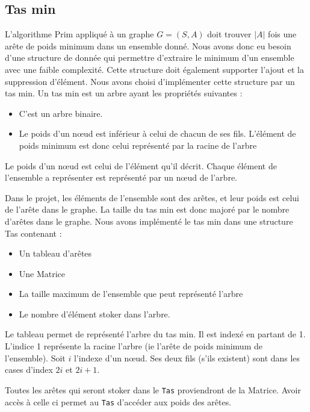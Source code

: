 \documentclass[a4paper,11pt]{article}
\begin{document}
\subsection{Tas min} %
L'algorithme Prim appliqué à un graphe $G = (S, A)$ doit trouver $|A|$ fois une arête de poids minimum dans un ensemble donné.
Nous avons donc eu besoin d'une structure de donnée qui permettre d'extraire le minimum d'un ensemble avec une faible complexité. Cette structure doit également supporter l'ajout et la suppression d'élément.
Nous avons choisi d'implémenter cette structure par un tas min.
Un tas min est un arbre ayant les propriétés suivantes :
\begin{itemize}
\item C'est un arbre binaire.
\item Le poids d'un nœud est inférieur à celui de chacun de ses fils. L'élément de poids minimum est donc celui représenté par la racine de l'arbre
\end{itemize}
Le poids d'un nœud est celui de l'élément qu'il décrit.
Chaque élément de l'ensemble a représenter est représenté par un nœud de l'arbre.

Dans le projet, les éléments de l'ensemble sont des arêtes, et leur poids est celui de l’arête dans le graphe. La taille du tas min est donc majoré par le nombre d’arêtes dans le graphe.
Nous avons implémenté le tas min dans une structure \textsf{Tas} contenant :
\begin{itemize}
\item Un tableau d’arêtes
\item Une Matrice
\item La taille maximum de l'ensemble que peut représenté l'arbre
\item Le nombre d'élément stoker dans l'arbre.
\end{itemize}
Le tableau permet de représenté l'arbre du tas min. Il est indexé en partant de 1.
L'indice 1 représente la racine l'arbre (ie l’arête de poids minimum de l'ensemble).
Soit $i$ l'indexe d'un nœud. Ses deux fils (s'ils existent) sont dans les cases d'index $2i$ et $2i +1$.

Toutes les arêtes qui seront stoker dans le \texttt{Tas} proviendront de la Matrice. Avoir accès à celle ci permet au \texttt{Tas} d'accéder aux poids des arêtes.
\end{document}
